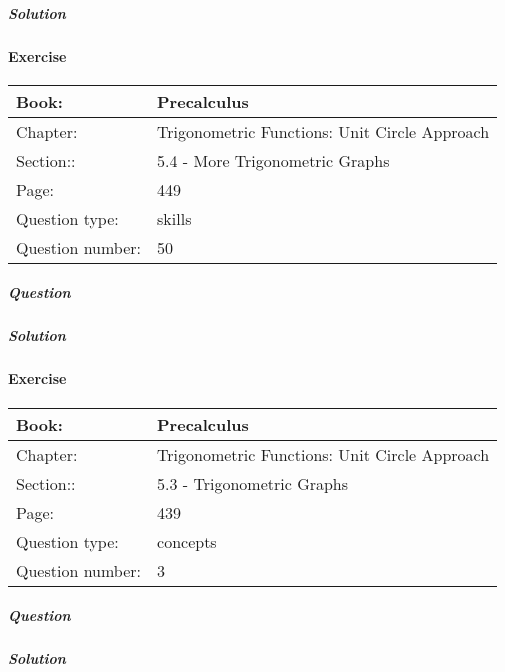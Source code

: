 \documentclass{article}
\begin{document}
            \subparagraph{Solution}
            
            
            \newpage
            \paragraph{Exercise}\par
            \noindent
            \begin{tabularx}{1\textwidth}{
                    p{}
                    p{}
                }
                \toprule
                Book: & Precalculus
                \\
                \midrule
                Chapter: & Trigonometric Functions: Unit Circle Approach
                \\
                \midrule
                Section:: & 5.4 - More Trigonometric Graphs
                \\
                \midrule
                Page: & 449
                \\
                \midrule
                Question type: & skills
                \\
                \midrule
                Question number: & 50
                \\
                \bottomrule
            \end{tabularx}
            \subparagraph{Question}
            
            \subparagraph{Solution}
            
            
            \newpage
            \paragraph{Exercise}\par
            \noindent
            \begin{tabularx}{1\textwidth}{
                    p{}
                    p{}
                }
                \toprule
                Book: & Precalculus
                \\
                \midrule
                Chapter: & Trigonometric Functions: Unit Circle Approach
                \\
                \midrule
                Section:: & 5.3 - Trigonometric Graphs
                \\
                \midrule
                Page: & 439
                \\
                \midrule
                Question type: & concepts
                \\
                \midrule
                Question number: & 3
                \\
                \bottomrule
            \end{tabularx}
            \subparagraph{Question}
            
            \subparagraph{Solution}
            
            
        
\end{document}
